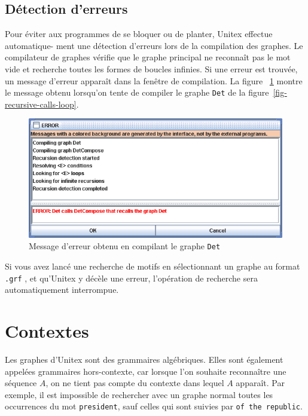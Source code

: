 \subsection{Détection d’erreurs}
Pour éviter aux programmes de se bloquer ou de planter, Unitex effectue automatique-
ment une détection d’erreurs lors de la compilation des graphes. Le compilateur de graphes
vérifie que le graphe principal ne reconnaît pas le mot vide et recherche toutes les formes de
boucles infinies. Si une erreur est trouvée, un message d’erreur apparaît dans la fenêtre de
compilation. La figure ~\ref{fig-error-message} montre le message obtenu lorsqu’on tente de 
compiler le graphe \verb+Det+ de la figure~\ref{fig-recursive-calls-loop}.

\begin{figure}[!h]
\begin{center}
\includegraphics[width=15cm]{resources/img/fig6-11.png}
\caption{Message d’erreur obtenu en compilant le graphe
\texttt{Det}\label{fig-error-message}}
\end{center}
\end{figure}

\noindent Si vous avez lancé une recherche de motifs en sélectionnant un graphe au format 
\verb+.grf+ , et qu’Unitex y décèle une erreur, l’opération
de recherche sera automatiquement interrompue.


\section{Contextes}
\label{section-contexts}

Les graphes d’Unitex sont des grammaires algébriques. Elles sont également appelées
grammaires hors-contexte, car lorsque l’on souhaite reconnaître une séquence
 $A$, on ne tient pas compte du contexte dans lequel $A$ apparaît. Par exemple, il est 
 impossible de rechercher avec un graphe normal toutes les occurrences du mot \verb+president+, 
 sauf celles qui sont suivies par \verb+of the republic+.


